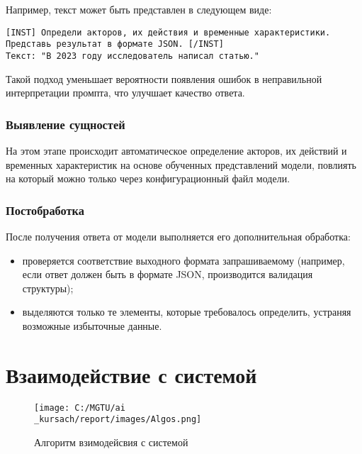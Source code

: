 Например, текст может быть представлен в следующем виде:
\begin{verbatim}
[INST] Определи акторов, их действия и временные характеристики. 
Представь результат в формате JSON. [/INST]
Текст: "В 2023 году исследователь написал статью."
\end{verbatim}

Такой подход уменьшает вероятности появления ошибок в неправильной интерпретации промпта, что улучшает качество ответа.

\subsubsection{Выявление сущностей}
На этом этапе происходит автоматическое определение акторов, их действий и временных характеристик на основе обученных представлений модели, 
повлиять на который можно только через конфигурационный файл модели.

\subsubsection{Постобработка}

После получения ответа от модели выполняется его дополнительная обработка:
\begin{itemize}
    \item проверяется соответствие выходного формата запрашиваемому (например, если ответ должен быть в формате JSON, производится валидация структуры);
    \item выделяются только те элементы, которые требовалось определить, устраняя возможные избыточные данные.
\end{itemize}

\section{Взаимодействие с системой}

\begin{figure}[H]
    \centering
    \texttt{[image: C:/MGTU/ai\\\_kursach/report/images/Algos.png]}
    \caption{Алгоритм взимодейсвия с системой}
    \label{fig:userToSystem}
\end{figure}

